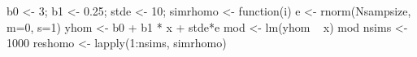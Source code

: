 \begin{Schunk}
\begin{Sinput}
 b0 <- 3; b1 <- 0.25; stde <- 10;
 simrhomo <- function(i){
  e <- rnorm(Nsampsize, m=0, s=1)
  yhom <- b0 + b1 * x + stde*e
  mod <- lm(yhom ~ x)
  mod
  }
 nsims <- 1000
 reshomo <- lapply(1:nsims, simrhomo)
\end{Sinput}
\end{Schunk}
